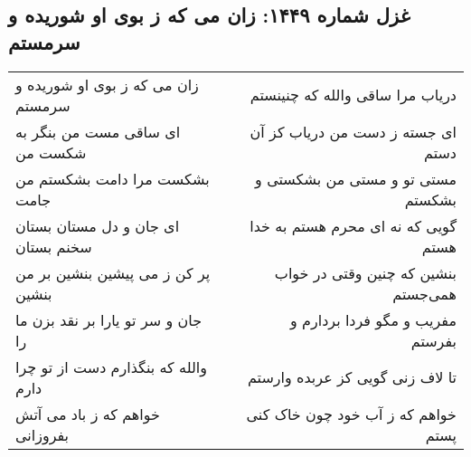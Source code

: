 \begin{center}
\section*{غزل شماره ۱۴۴۹: زان می که ز بوی او شوریده و سرمستم}
\label{sec:1449}
\begin{longtable}{l p{0.5cm} r}
زان می که ز بوی او شوریده و سرمستم
&&
دریاب مرا ساقی والله که چنینستم
\\
ای ساقی مست من بنگر به شکست من
&&
ای جسته ز دست من دریاب کز آن دستم
\\
بشکست مرا دامت بشکستم من جامت
&&
مستی تو و مستی من بشکستی و بشکستم
\\
ای جان و دل مستان بستان سخنم بستان
&&
گویی که نه ای محرم هستم به خدا هستم
\\
پر کن ز می پیشین بنشین بر من بنشین
&&
بنشین که چنین وقتی در خواب همی‌جستم
\\
جان و سر تو یارا بر نقد بزن ما را
&&
مفریب و مگو فردا بردارم و بفرستم
\\
والله که بنگذارم دست از تو چرا دارم
&&
تا لاف زنی گویی کز عربده وارستم
\\
خواهم که ز باد می آتش بفروزانی
&&
خواهم که ز آب خود چون خاک کنی پستم
\\
\end{longtable}
\end{center}
